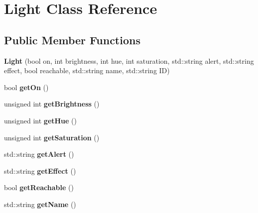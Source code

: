 \hypertarget{classLight}{}\section{Light Class Reference}
\label{classLight}
\subsection*{Public Member Functions}
\begin{DoxyCompactItemize}
\item 
\mbox{\label{classLight_a8dbd83a5bd64a6f823d6d86ce3c12d38}} 
{\bfseries Light} (bool on, int brightness, int hue, int saturation, std\+::string alert, std\+::string effect, bool reachable, std\+::string name, std\+::string ID)
\item 
\mbox{\label{classLight_a853a20a23503b56aeb0176c42a45e30b}} 
bool {\bfseries get\+On} ()
\item 
\mbox{\label{classLight_a092c0b63c2385c8618243cc63a571280}} 
unsigned int {\bfseries get\+Brightness} ()
\item 
\mbox{\label{classLight_a9085372523fd9a0b0aafa72594541e2b}} 
unsigned int {\bfseries get\+Hue} ()
\item 
\mbox{\label{classLight_a7dd87d36565a9daaedf1935e213e999e}} 
unsigned int {\bfseries get\+Saturation} ()
\item 
\mbox{\label{classLight_a49a7938ea53bf9e067acf055a5be98ec}} 
std\+::string {\bfseries get\+Alert} ()
\item 
\mbox{\label{classLight_a5a32eb91728ceabbf1936d46a0d370c9}} 
std\+::string {\bfseries get\+Effect} ()
\item 
\mbox{\label{classLight_aee4545509a49fddb3c149fe9376a655a}} 
bool {\bfseries get\+Reachable} ()
\item 
\mbox{\label{classLight_a248c379885ea63ee7d71f7e19b0dab80}} 
std\+::string {\bfseries get\+Name} ()
\item 
\mbox{\label{classLight_a7a41305231132e8bae6a899b703fd39a}} 

\end{DoxyCompactItemize}
